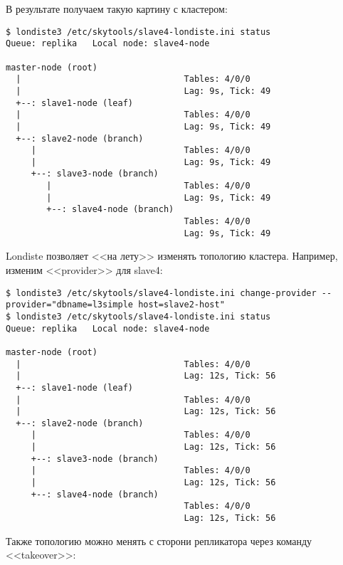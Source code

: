 В результате получаем такую картину с кластером:

\begin{lstlisting}[label=lst:londiste-cascade6,caption=Кластер с каскадной репликацией]
$ londiste3 /etc/skytools/slave4-londiste.ini status
Queue: replika   Local node: slave4-node

master-node (root)
  |                                Tables: 4/0/0
  |                                Lag: 9s, Tick: 49
  +--: slave1-node (leaf)
  |                                Tables: 4/0/0
  |                                Lag: 9s, Tick: 49
  +--: slave2-node (branch)
     |                             Tables: 4/0/0
     |                             Lag: 9s, Tick: 49
     +--: slave3-node (branch)
        |                          Tables: 4/0/0
        |                          Lag: 9s, Tick: 49
        +--: slave4-node (branch)
                                   Tables: 4/0/0
                                   Lag: 9s, Tick: 49
\end{lstlisting}

Londiste позволяет <<на лету>> изменять топологию кластера. Например, изменим <<provider>> для slave4:

\begin{lstlisting}[label=lst:londiste-cascade7,caption=Изменяем топологию]
$ londiste3 /etc/skytools/slave4-londiste.ini change-provider --provider="dbname=l3simple host=slave2-host"
$ londiste3 /etc/skytools/slave4-londiste.ini status
Queue: replika   Local node: slave4-node

master-node (root)
  |                                Tables: 4/0/0
  |                                Lag: 12s, Tick: 56
  +--: slave1-node (leaf)
  |                                Tables: 4/0/0
  |                                Lag: 12s, Tick: 56
  +--: slave2-node (branch)
     |                             Tables: 4/0/0
     |                             Lag: 12s, Tick: 56
     +--: slave3-node (branch)
     |                             Tables: 4/0/0
     |                             Lag: 12s, Tick: 56
     +--: slave4-node (branch)
                                   Tables: 4/0/0
                                   Lag: 12s, Tick: 56
\end{lstlisting}

Также топологию можно менять с сторони репликатора через команду <<takeover>>:

